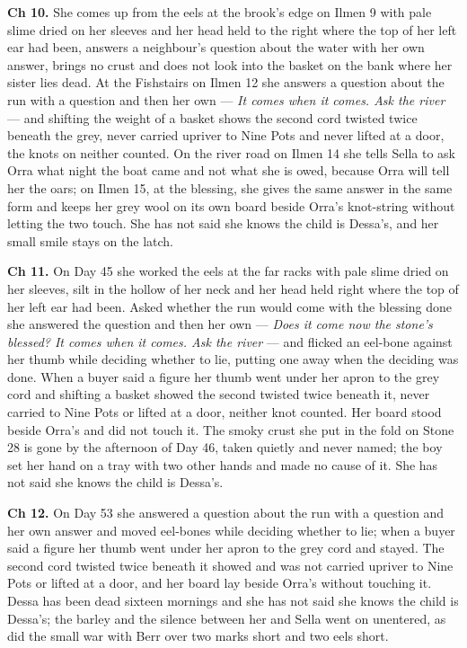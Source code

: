 \documentclass{design/chronicle}
\begin{document}
{\textbf{Ch 10.} She comes up from the eels at the brook’s edge on Ilmen 9 with pale slime dried on her sleeves and her head held to the right where the top of her left ear had been, answers a neighbour’s question about the water with her own answer, brings no crust and does not look into the basket on the bank where her sister lies dead. At the Fishstairs on Ilmen 12 she answers a question about the run with a question and then her own --- \emph{It comes when it comes. Ask the river} --- and shifting the weight of a basket shows the second cord twisted twice beneath the grey, never carried upriver to Nine Pots and never lifted at a door, the knots on neither counted. On the river road on Ilmen 14 she tells Sella to ask Orra what night the boat came and not what she is owed, because Orra will tell her the oars; on Ilmen 15, at the blessing, she gives the same answer in the same form and keeps her grey wool on its own board beside Orra’s knot-string without letting the two touch. She has not said she knows the child is Dessa’s, and her small smile stays on the latch.

\textbf{Ch 11.} On Day 45 she worked the eels at the far racks with pale slime dried on her sleeves, silt in the hollow of her neck and her head held right where the top of her left ear had been. Asked whether the run would come with the blessing done she answered the question and then her own --- \emph{Does it come now the stone’s blessed? It comes when it comes. Ask the river} --- and flicked an eel-bone against her thumb while deciding whether to lie, putting one away when the deciding was done. When a buyer said a figure her thumb went under her apron to the grey cord and shifting a basket showed the second twisted twice beneath it, never carried to Nine Pots or lifted at a door, neither knot counted. Her board stood beside Orra’s and did not touch it. The smoky crust she put in the fold on Stone 28 is gone by the afternoon of Day 46, taken quietly and never named; the boy set her hand on a tray with two other hands and made no cause of it. She has not said she knows the child is Dessa’s.

\textbf{Ch 12.} On Day 53 she answered a question about the run with a question and her own answer and moved eel-bones while deciding whether to lie; when a buyer said a figure her thumb went under her apron to the grey cord and stayed. The second cord twisted twice beneath it showed and was not carried upriver to Nine Pots or lifted at a door, and her board lay beside Orra’s without touching it. Dessa has been dead sixteen mornings and she has not said she knows the child is Dessa’s; the barley and the silence between her and Sella went on unentered, as did the small war with Berr over two marks short and two eels short.

}
\end{document}
